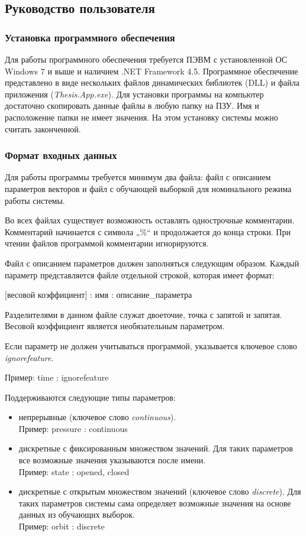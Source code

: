 \subsection{Руководство пользователя}
\subsubsection{Установка программного обеспечения}
Для работы программного обеспечения требуется ПЭВМ с установленной ОС Windows 7 и выше и наличием .NET Framework 4.5. Программное обеспечение представлено в виде нескольких файлов динамических библиотек (DLL) и файла приложения (\textit{Thesis.App.exe}). Для установки программы на компьютер достаточно скопировать данные файлы в любую папку на ПЗУ. Имя и расположение папки не имеет значения. На этом установку системы можно считать законченной.

\subsubsection{Формат входных данных}
Для работы программы требуется минимум два файла: файл с описанием параметров векторов и файл с обучающей выборкой для номинального режима работы системы.

Во всех файлах существует возможность оставлять однострочные комментарии. Комментарий начинается с символа „\%“ и продолжается до конца строки. При чтении файлов программой комментарии игнорируются.

Файл с описанием параметров должен заполняться следующим образом. Каждый параметр представляется файле отдельной строкой, которая имеет формат:

\textsf{[весовой коэффициент] : имя : описание\_параметра}

Разделителями в данном файле служат двоеточие, точка с запятой и запятая. Весовой коэффициент является необязательным параметром.

Если параметр не должен учитываться программой, указывается ключевое слово \textit{ignorefeature}.

Пример: \textsf{time : ignorefeature}

Поддерживаются следующие типы параметров:
\begin{itemize}
	\item непрерывные (ключевое слово \textit{continuous}). \\ Пример: \textsf{pressure : continuous}
	\item дискретные с фиксированным множеством значений. Для таких параметров все возможные значения указываются после имени. \\ Пример: \textsf{state : opened, closed}
	\item дискретные с открытым множеством значений (ключевое слово \textit{discrete}). Для таких параметров системы сама определяет возможные значения на основе данных из обучающих выборок. \\ Пример: \textsf{orbit : discrete}
\end{itemize}

